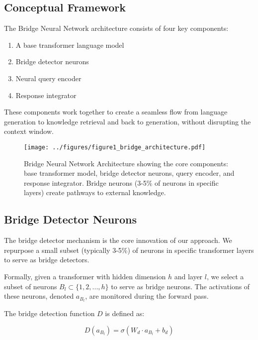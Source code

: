 \documentclass[9pt,a4paper,twocolumn,twoside]{tau-class/tau}
\begin{document}
\subsection{Conceptual Framework}

    The Bridge Neural Network architecture consists of four key components:
    \begin{enumerate}
        \item A base transformer language model
        \item Bridge detector neurons
        \item Neural query encoder
        \item Response integrator
    \end{enumerate}

    These components work together to create a seamless flow from language generation to knowledge retrieval and back to generation, without disrupting the context window.

    \begin{figure}[h]
        \centering
        \texttt{[image: ../figures/figure1\_bridge\_architecture.pdf]}
        \caption{Bridge Neural Network Architecture showing the core components: base transformer model, bridge detector neurons, query encoder, and response integrator. Bridge neurons (3-5\% of neurons in specific layers) create pathways to external knowledge.}
        \label{fig:architecture}
    \end{figure}

\subsection{Bridge Detector Neurons}

    The bridge detector mechanism is the core innovation of our approach. We repurpose a small subset (typically 3-5\%) of neurons in specific transformer layers to serve as bridge detectors.

    Formally, given a transformer with hidden dimension $h$ and layer $l$, we select a subset of neurons $B_l \subset \{1, 2, ..., h\}$ to serve as bridge neurons. The activations of these neurons, denoted $a_{B_l}$, are monitored during the forward pass.

    The bridge detection function $D$ is defined as:

    \begin{equation}
        D(a_{B_l}) = \sigma(W_d \cdot a_{B_l} + b_d)
    \end{equation}
\end{document}
